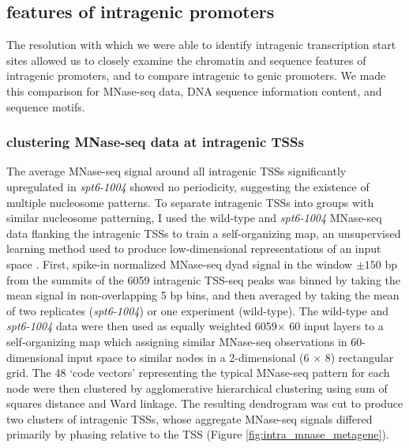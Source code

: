 \documentclass[9pt, letterpaper]{article}
\begin{document}
\subsection{features of intragenic promoters}

The resolution with which we were able to identify intragenic transcription start sites allowed us to closely examine the chromatin and sequence features of intragenic promoters, and to compare intragenic to genic promoters. We made this comparison for MNase-seq data, DNA sequence information content, and sequence motifs.

\subsubsection{clustering MNase-seq data at intragenic TSSs}

The average MNase-seq signal around all intragenic TSSs significantly upregulated in \textit{spt6-1004} showed no periodicity, suggesting the existence of multiple nucleosome patterns. To separate intragenic TSSs into groups with similar nucleosome patterning, I used the wild-type and \textit{spt6-1004} MNase-seq data flanking the intragenic TSSs to train a self-organizing map, an unsupervised learning method used to produce low-dimensional representations of an input space \cite{wehrens2007}. First, spike-in normalized MNase-seq dyad signal in the window $\pm 150$ bp from the summits of the 6059 intragenic TSS-seq peaks was binned by taking the mean signal in non-overlapping 5 bp bins, and then averaged by taking the mean of two replicates (\textit{spt6-1004}) or one experiment (wild-type). The wild-type and \textit{spt6-1004} data were then used as equally weighted 6059$\times$ 60 input layers to a self-organizing map which assigning similar MNase-seq observations in 60-dimensional input space to similar nodes in a 2-dimensional (6 $\times$ 8) rectangular grid. The 48 `code vectors' representing the typical MNase-seq pattern for each node were then clustered by agglomerative hierarchical clustering using sum of squares distance and Ward linkage. The resulting dendrogram was cut to produce two clusters of intragenic TSSs, whose aggregate MNase-seq signals differed primarily by phasing relative to the TSS (Figure \ref{fig:intra_mnase_metagene}).
\end{document}
